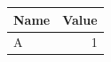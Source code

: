 \documentclass{article}
\begin{document}
\begin{tabular}{lr}
\toprule
Name & Value \\
\midrule
A & 1 \\
\bottomrule
\end{tabular}
\end{document}
